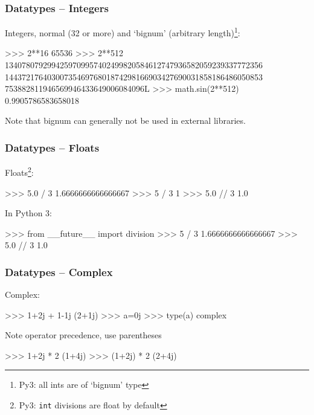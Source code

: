 \documentclass[xetex,10pt]{beamer}
\def\pythoni{\lstinline[language=pythontim]}
\def\spacer{\vspace*{1em}}
\newcommand{\pypypy}[1]{\footnote[frame]{Py3: #1}}
\begin{document}
\begin{frame}[fragile]
	\frametitle{Datatypes -- Integers}

	Integers, normal (32 or more) and `bignum' (arbitrary length)\pypypy{all ints are of `bignum' type}:

	\spacer

\begin{python}
>>> 2**16
65536
>>> 2**512
1340780792994259709957402499820584612747936582059239337772356
1443721764030073546976801874298166903427690031858186486050853
753882811946569946433649006084096L
>>> math.sin(2**512)
0.9905786583658018
\end{python}

	\spacer

Note that bignum can generally not be used in external libraries.
\end{frame}


\begin{frame}[fragile]
	\frametitle{Datatypes -- Floats}

Floats\pypypy{\pythoni{int} divisions are float by default}:
\begin{python}
>>> 5.0 / 3
1.6666666666666667
>>> 5 / 3
1
>>> 5.0 // 3
1.0
\end{python}

\spacer

\pause
In Python 3:

\begin{python}
>>> from __future__ import division
>>> 5 / 3
1.6666666666666667
>>> 5.0 // 3
1.0
\end{python}

\end{frame}


\begin{frame}[fragile]
	\frametitle{Datatypes -- Complex}

Complex:
\begin{python}
>>> 1+2j + 1-1j
(2+1j)
>>> a=0j
>>> type(a)
complex
\end{python}

\spacer

Note operator precedence, use parentheses
\begin{python}
>>> 1+2j * 2
(1+4j)
>>> (1+2j) * 2
(2+4j)
\end{python}

\end{frame}
\end{document}
